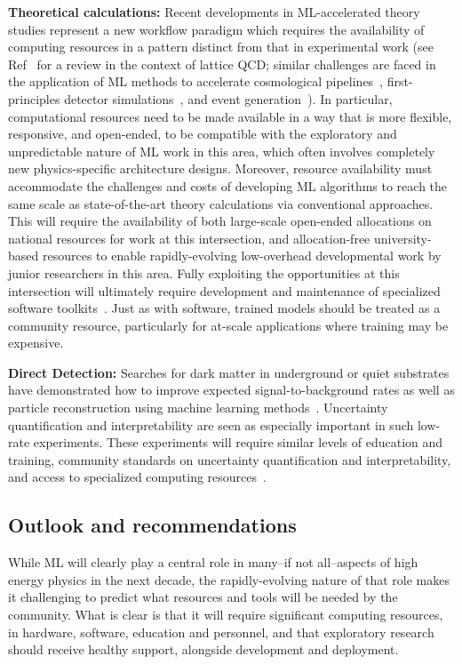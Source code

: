 \documentclass[submission,Phys]{SciPost}
\begin{document}
{\bf Theoretical calculations:} Recent developments in ML-accelerated theory studies represent a new workflow paradigm which requires the availability of computing resources in a pattern distinct from that in experimental work (see Ref~\cite{Boyda:2022nmh} for a review in the context of lattice QCD; similar challenges are faced in the application of ML methods to accelerate cosmological pipelines~\cite{Dvorkin:2022pwo}, first-principles detector simulations~\cite{Hollingsworth:2021sii,Morrison:2022vqe}, and event generation~\cite{Butter:2022rso}). In particular, computational resources need to be made available in a way that is more flexible, responsive, and open-ended, to be compatible with the exploratory and unpredictable nature of ML work in this area, which often involves completely new physics-specific architecture designs. Moreover, resource availability must accommodate the challenges and costs of developing ML algorithms to reach the same scale as state-of-the-art theory calculations via conventional approaches. This will require the availability of both large-scale open-ended allocations on national resources for work at this intersection, and allocation-free university-based resources to enable rapidly-evolving low-overhead developmental work by junior researchers in this area. 
Fully exploiting the opportunities at this intersection will ultimately require development and maintenance of specialized software toolkits~\cite{Boyda:2022nmh}. Just as with software, trained models should be treated as a community resource, particularly for at-scale applications where training may be expensive.

{\bf Direct Detection: } Searches for dark matter in underground or quiet substrates have demonstrated how to improve expected signal-to-background rates as well as particle reconstruction using machine learning methods~\cite{Kahn:2022kae}.  Uncertainty quantification and interpretability are seen as especially important in such low-rate experiments. These experiments will require similar levels of education and training, community standards on uncertainty quantification and interpretability, and access to specialized computing resources~\cite{Roberts:2022ezy}.

\subsection{Outlook and recommendations}

While ML will clearly play a central role in many--if not all--aspects of high energy physics in the next decade, the rapidly-evolving nature of that role makes it challenging to predict what resources and tools will be needed by the community. What is clear is that it will require significant computing resources, in hardware, software, education and personnel, and that exploratory research should receive healthy support, alongside development and deployment.
\end{document}
